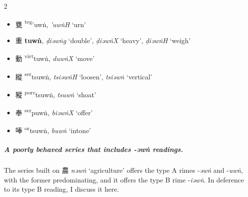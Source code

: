 \begin{multicols}{2}
\begin{minipage}{\columnwidth}
\begin{itemize}[leftmargin=*, labelsep=0.5em]
    \item {\Large{甕}} %
    {\large{{\textsuperscript{teg}}'uwṅ}},
      \textit{'uwṅH} 
`urn' %
\end{itemize}
\end{minipage}

\bigskip
\bigskip


\begin{itemize}
    \item {\Large{重}} 
    {\large{\textbf{tuwṅ}}},
 \textit{ḍiəwṅg} `double', \textit{ḍiəwṅX}
 `heavy', \textit{ḍiəwṅH} `weigh'  %

    \item {\Large{動}} %
    {\large{{\textsuperscript{virt}}tuwṅ}},
      \textit{duwṅX} 
`move' %

\end{itemize}

\medskip



\begin{itemize}
    \item \begin{flushleft}   {\Large{縱}}     {\large{{\textsuperscript{ser}}tsuwṅ}},
 \textit{tsiəwṅH} `loosen',  \textit{tsiəwṅ} `vertical'     \end{flushleft}


    \item {\Large{豵}}  
    {\large{{\textsuperscript{porc}}tsuwṅ}},
   \textit{tsuwṅ} `shoat' %

\end{itemize}


\begin{itemize}
    \item \begin{flushleft}   {\Large{奉}}     {\large{{\textsuperscript{ser}}puwṅ}},
 \textit{biəwṅX} `offer'    \end{flushleft}


    \item {\Large{唪}}  
    {\large{{\textsuperscript{or}}tsuwṅ}},
   \textit{buwṅ} `intone' %

\end{itemize}


\end{multicols}


\subparagraph{A poorly behaved series that includes  -\textit{əwṅ} readings.}
The series built on 
農 %
    \textit{nəwṅ} `agriculture' offers the type A rimes 
-\textit{əwṅ} and -\textit{uwṅ}, with the former predominating, and it offers the type B rime   
-\textit{iəwṅ}. In deference to its type B reading, I discuss it here.  

